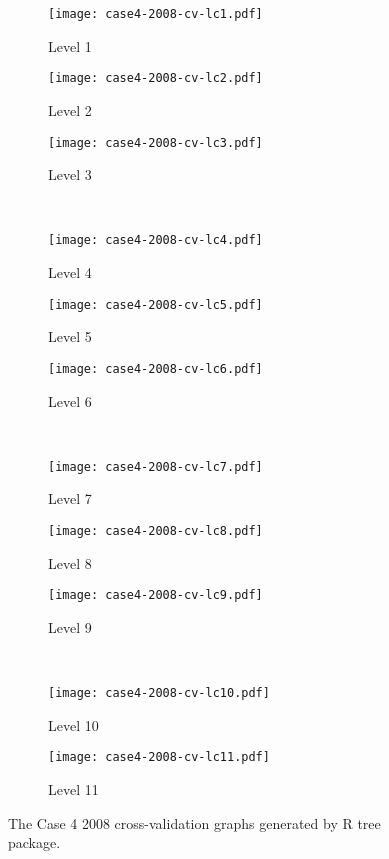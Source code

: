 \begin{appendices}
\begin{figure}[!ht] \centering
	\captionsetup[subfigure]{width=2.0in}
	\begin{subfigure}[t]{0.32\textwidth}
		\texttt{[image: case4-2008-cv-lc1.pdf]}
		\caption{Level 1}
	\end{subfigure}
	\begin{subfigure}[t]{0.32\textwidth}
		\texttt{[image: case4-2008-cv-lc2.pdf]}
		\caption{Level 2}
	\end{subfigure}
	\begin{subfigure}[t]{0.32\textwidth}
		\texttt{[image: case4-2008-cv-lc3.pdf]}
		\caption{Level 3}
	\end{subfigure}\\
	\vspace{5pt}
	\begin{subfigure}[t]{0.32\textwidth}
		\texttt{[image: case4-2008-cv-lc4.pdf]}
		\caption{Level 4}
	\end{subfigure}
	\begin{subfigure}[t]{0.32\textwidth}
		\texttt{[image: case4-2008-cv-lc5.pdf]}
		\caption{Level 5}
	\end{subfigure}
	\begin{subfigure}[t]{0.32\textwidth}
		\texttt{[image: case4-2008-cv-lc6.pdf]}
		\caption{Level 6}
	\end{subfigure}\\
	\vspace{5pt}	
	\begin{subfigure}[t]{0.32\textwidth}
		\texttt{[image: case4-2008-cv-lc7.pdf]}
		\caption{Level 7}
	\end{subfigure}
	\begin{subfigure}[t]{0.32\textwidth}
		\texttt{[image: case4-2008-cv-lc8.pdf]}
		\caption{Level 8}
	\end{subfigure}
	\begin{subfigure}[t]{0.32\textwidth}
		\texttt{[image: case4-2008-cv-lc9.pdf]}
		\caption{Level 9}
	\end{subfigure}\\
	\vspace{5pt}
	\begin{subfigure}[t]{0.32\textwidth}
		\texttt{[image: case4-2008-cv-lc10.pdf]}
		\caption{Level 10}
	\end{subfigure}
	\begin{subfigure}[t]{0.32\textwidth}
		\texttt{[image: case4-2008-cv-lc11.pdf]}
		\caption{Level 11}
	\end{subfigure}
	\vspace{5pt}
	\caption[The Case 4 2008 cross-validation graphs generated by R tree package.]{The Case 4 2008 cross-validation graphs generated by R tree package.}
	\label{fig: appendix-fig.c28.cv}
\end{figure}


\end{appendices}

